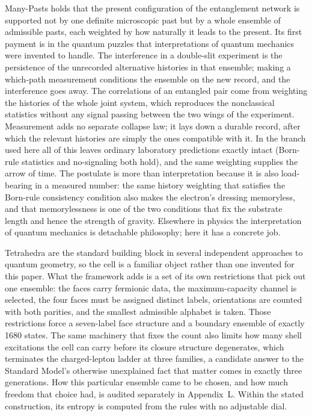 \documentclass[11pt]{article}
\begin{document}
Many-Pasts holds that the present configuration of the entanglement network is supported not by one definite microscopic past but by a whole ensemble of admissible pasts, each weighted by how naturally it leads to the present. Its first payment is in the quantum puzzles that interpretations of quantum mechanics were invented to handle. The interference in a double-slit experiment is the persistence of the unrecorded alternative histories in that ensemble; making a which-path measurement conditions the ensemble on the new record, and the interference goes away. The correlations of an entangled pair come from weighting the histories of the whole joint system, which reproduces the nonclassical statistics without any signal passing between the two wings of the experiment. Measurement adds no separate collapse law; it lays down a durable record, after which the relevant histories are simply the ones compatible with it. In the branch used here all of this leaves ordinary laboratory predictions exactly intact (Born-rule statistics and no-signaling both hold), and the same weighting supplies the arrow of time. The postulate is more than interpretation because it is also load-bearing in a measured number: the same history weighting that satisfies the Born-rule consistency condition also makes the electron's dressing memoryless, and that memorylessness is one of the two conditions that fix the substrate length and hence the strength of gravity. Elsewhere in physics the interpretation of quantum mechanics is detachable philosophy; here it has a concrete job.

Tetrahedra are the standard building block in several independent approaches to quantum geometry, so the cell is a familiar object rather than one invented for this paper. What the framework adds is a set of its own restrictions that pick out one ensemble: the faces carry fermionic data, the maximum-capacity channel is selected, the four faces must be assigned distinct labels, orientations are counted with both parities, and the smallest admissible alphabet is taken. Those restrictions force a seven-label face structure and a boundary ensemble of exactly 1680 states. The same machinery that fixes the count also limits how many shell excitations the cell can carry before its closure structure degenerates, which terminates the charged-lepton ladder at three families, a candidate answer to the Standard Model's otherwise unexplained fact that matter comes in exactly three generations. How this particular ensemble came to be chosen, and how much freedom that choice had, is audited separately in Appendix~L. Within the stated construction, its entropy is computed from the rules with no adjustable dial.
\end{document}
